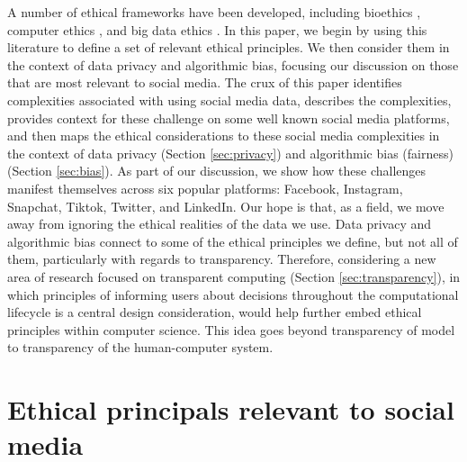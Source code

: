 \documentclass[11pt]{article} %
\begin{document}
A number of ethical frameworks have been developed, including bioethics \cite{Turoldo2008,TANGWA2009S2}, computer ethics \cite{10.1145/3376898}, and big data ethics \cite{7515114,Lipworth2017}.  In this paper, we begin by using this literature to define a set of relevant ethical principles. We then consider them in the context of data privacy and algorithmic bias, focusing our discussion on those that are most relevant to social media. The crux of this paper identifies complexities associated with using social media data, describes the complexities, provides context for these challenge on some well known social media platforms, and then maps the ethical considerations to these social media complexities in the context of data privacy (Section \ref{sec:privacy}) and algorithmic bias (fairness) (Section \ref{sec:bias}).  As part of our discussion, we show how these challenges manifest themselves across six popular platforms: Facebook, Instagram, Snapchat, Tiktok, Twitter, and LinkedIn. Our hope is that, as a field, we move away from ignoring the ethical realities of the data we use. Data privacy and algorithmic bias connect to some of the ethical principles we define, but not all of them, particularly with regards to transparency. Therefore, considering a new area of research focused on transparent computing (Section \ref{sec:transparency}), in which principles of informing users about decisions throughout the computational lifecycle is a central design consideration, would help further embed ethical principles within computer science. This idea goes beyond transparency of model to transparency of the human-computer system.

\section{Ethical principals relevant to social media}
\label{sec:ethics}
\end{document}
